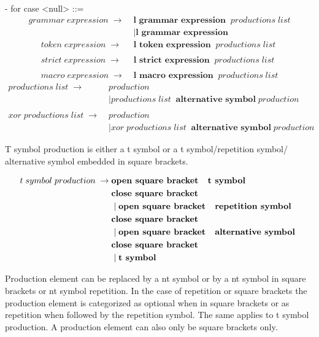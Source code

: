 - for case <null> ::=
\begin{align*}
	grammar\;expression\; \rightarrow\; &\textbf{l grammar expression}\;\;productions\;list \\ 
               &\mid \textbf{l grammar expression} 
\end{align*}
\begin{align*}        
	token\;expression\; \rightarrow\; &\textbf{l token expression} \;\;productions\;list \\ \\
	strict\;expression\; \rightarrow\; &\textbf{l strict expression} \;\;productions\;list \\ \\
	macro\;expression\; \rightarrow\; &\textbf{l macro expression} \;\;productions\;list 
\end{align*}
\begin{align*}
	productions\;list\; \rightarrow\; &production \\
               &\mid productions\;list\;\;\textbf{alternative symbol} \;production \\ \\                   
	xor\;productions\;list\; \rightarrow\; &production \\
               &\mid xor\;productions\;list\;\;\textbf{alternative symbol}\;production 
\end{align*}

T symbol production is either a t symbol or a t symbol/repetition symbol/ alternative symbol embedded in square brackets.

\begin{align*}
	t\;symbol\;production\; \rightarrow\; & \textbf{open square bracket \; t symbol} \\ &\textbf{close square bracket}\\
               &\mid \textbf{open square bracket \; repetition symbol} \\ &\textbf{close square bracket}\\
               &\mid \textbf{open square bracket \; alternative symbol } \\ &\textbf{close square bracket}\\
               &\mid \textbf{t symbol} 
\end{align*}

Production element can be replaced by a nt symbol or by a nt symbol in square brackets or nt symbol repetition. In the case of repetition or square brackets the production element is categorized as optional when in square brackets or as repetition when followed by the repetition symbol. The same applies to t symbol production. A production element can also only be square brackets only.

